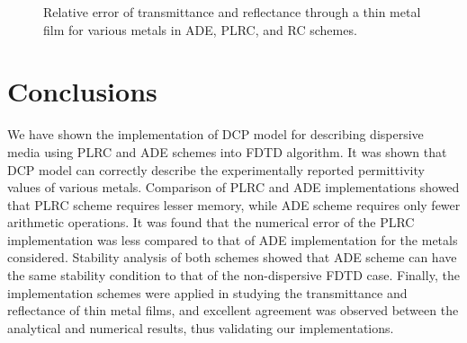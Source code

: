 \begin{figure}[hp!]
  \begin{center}
  \end{center}
  \caption{Relative error of transmittance and reflectance through a thin metal film for various metals in ADE, PLRC, and RC schemes.}
  \label{fig:thin_metals_t_r_error}
\end{figure}

\section{Conclusions}
We have shown the implementation of DCP model for describing dispersive media using PLRC and ADE schemes into FDTD algorithm. It was shown that DCP model can correctly describe the experimentally reported permittivity values of various metals. Comparison of PLRC and ADE implementations showed that PLRC scheme requires lesser memory, while ADE scheme requires only fewer arithmetic operations. It was found that the numerical error of the PLRC implementation was less compared to that of ADE implementation for the metals considered. Stability analysis of both schemes showed that ADE scheme can have the same stability condition to that of the non-dispersive FDTD case. Finally, the implementation schemes were applied in studying the transmittance and reflectance of thin metal films, and excellent agreement was observed between the analytical and numerical results, thus validating our implementations.  

